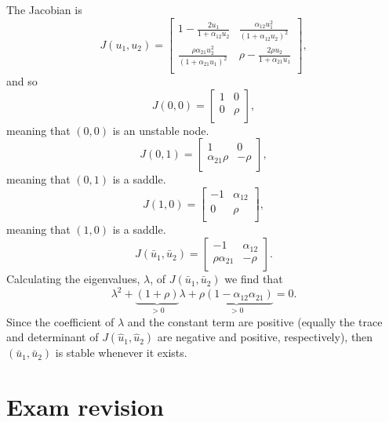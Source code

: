 \documentclass[]{article}
\newcommand{\bb}{\begin{equation}}
\newcommand{\ee}{\end{equation}}
\renewcommand{\l}{\left(}
\renewcommand{\r}{\right)}
\begin{document}
\begin{Answ}
\subsubsection{}
The Jacobian is
\bb
J(u_1,u_2)=\left[ {\begin{array}{cc}
   1-\frac{2u_1}{1+\alpha_{12}u_2} & \frac{\alpha_{12} u_1^2}{\l 1+\alpha_{12}u_2\r^2} \\
   \frac{\rho\alpha_{21} u_2^2}{\l 1+\alpha_{21}u_1\r^2} & \rho -\frac{2\rho u_2}{1+\alpha_{21}u_1} \\
  \end{array} } \right],
\ee
and so
\bb
J(0,0)=\left[ {\begin{array}{cc}
   1 & 0 \\
   0 & \rho \\
  \end{array} } \right],
\ee
meaning that $(0,0)$ is an unstable node.
\bb
J(0,1)=\left[ {\begin{array}{cc}
   1 & 0 \\
   \alpha_{21}\rho & -\rho \\
  \end{array} } \right],
\ee
meaning that $(0,1)$ is a saddle.
\bb
J(1,0)=\left[ {\begin{array}{cc}
   -1 & \alpha_{12} \\
   0 & \rho \\
  \end{array} } \right],
\ee
meaning that $(1,0)$ is a saddle.
\bb
J(\bar{u}_1,\bar{u}_2)=\left[ {\begin{array}{cc}
   -1 & \alpha_{12} \\
   \rho\alpha_{21} & -\rho \\
  \end{array} } \right].
\ee
Calculating the eigenvalues, $\lambda$, of $J(\bar{u}_1,\bar{u}_2)$ we find that
\bb
\lambda^2 +\underbrace{(1+\rho)}_{>0}\lambda+\underbrace{\rho(1-\alpha_{12}\alpha_{21})}_{>0}=0.
\ee
Since the coefficient of $\lambda$ and the constant term are positive (equally the trace and determinant of $J(\hat{u}_1,\hat{u}_2)$ are negative and positive, respectively), then $(\bar{u}_1,\bar{u}_2)$ is stable whenever it exists.
\end{Answ}

\section*{Exam revision}
\end{document}
